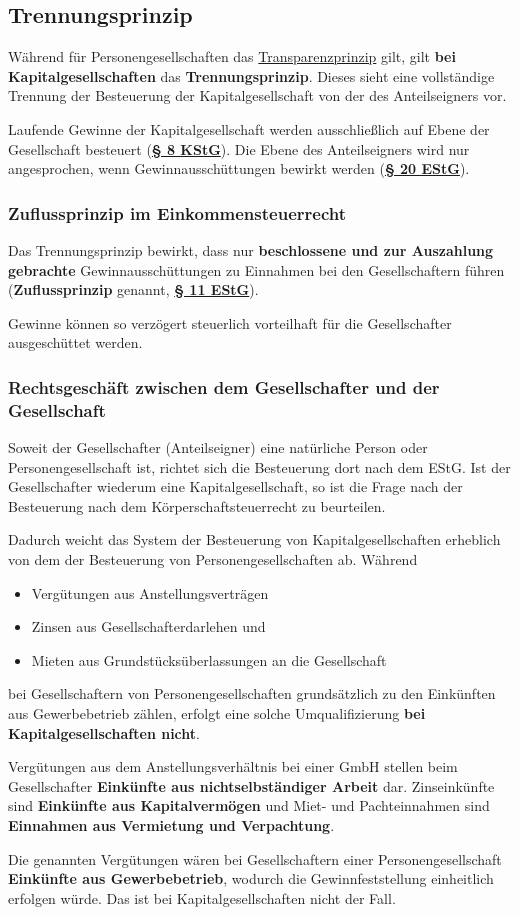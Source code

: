 \documentclass[12pt,A4]{extarticle}
\newcommand{\highlight}[1]{\textcolor{highlightColor}{\textbf{#1}}}
\newcommand{\estG}[2][]{\textbf{\textcolor{gesetzLink}{\href{https://www.gesetze-im-internet.de/estg/__#2.html}{§ #2 \ifthenelse{\equal{#1}{}}{}{#1 }EStG}}}}
\newcommand{\kstG}[2][]{\textbf{\textcolor{gesetzLink}{\href{https://www.gesetze-im-internet.de/kstg_1977/__#2.html}{§ #2 \ifthenelse{\equal{#1}{}}{}{#1 }KStG}}}}
\begin{document}
\subsection{Trennungsprinzip}
Während für Personengesellschaften das \hyperref[sec:transparenzprinzip]{Transparenzprinzip} gilt, gilt \textbf{bei Kapitalgesellschaften} das \highlight{Trennungsprinzip}. Dieses sieht eine vollständige Trennung der Besteuerung der Kapitalgesellschaft von der des Anteilseigners vor.\par
Laufende Gewinne der Kapitalgesellschaft werden ausschließlich auf Ebene der Gesellschaft besteuert (\kstG[Abs. 3 Satz 1]{8}). Die Ebene des Anteilseigners wird nur angesprochen, wenn Gewinnausschüttungen bewirkt werden (\estG[Abs. 1 Nr. 1]{20}).

\subsubsection{Zuflussprinzip im Einkommensteuerrecht}
Das Trennungsprinzip bewirkt, dass nur \textbf{beschlossene und zur Auszahlung gebrachte} Gewinnausschüttungen zu Einnahmen bei den Gesellschaftern führen (\highlight{Zuflussprinzip} genannt, \estG{11}).\par
Gewinne können so verzögert steuerlich vorteilhaft für die Gesellschafter ausgeschüttet werden.

\subsubsection{Rechtsgeschäft zwischen dem Gesellschafter und der Gesellschaft}
Soweit der Gesellschafter (Anteilseigner) eine natürliche Person oder Personengesellschaft ist, richtet sich die Besteuerung dort nach dem EStG. Ist der Gesellschafter wiederum eine Kapitalgesellschaft, so ist die Frage nach der Besteuerung nach dem Körperschaftsteuerrecht zu beurteilen.\par
Dadurch weicht das System der Besteuerung von Kapitalgesellschaften erheblich von dem der Besteuerung von Personengesellschaften ab. Während
\begin{itemize}
  \item{Vergütungen aus Anstellungsverträgen}
  \item{Zinsen aus Gesellschafterdarlehen und}
  \item{Mieten aus Grundstücksüberlassungen an die Gesellschaft}
\end{itemize}
bei Gesellschaftern von Personengesellschaften grundsätzlich zu den Einkünften aus Gewerbebetrieb zählen, erfolgt eine solche Umqualifizierung \textbf{bei Kapitalgesellschaften nicht}.\par
Vergütungen aus dem Anstellungsverhältnis bei einer GmbH stellen beim Gesellschafter \textbf{Einkünfte aus nichtselbständiger Arbeit} dar. Zinseinkünfte sind \textbf{Einkünfte aus Kapitalvermögen} und Miet- und Pachteinnahmen sind \textbf{Einnahmen aus Vermietung und Verpachtung}.\par
Die genannten Vergütungen wären bei Gesellschaftern einer Personengesellschaft \textbf{Einkünfte aus Gewerbebetrieb}, wodurch die Gewinnfeststellung einheitlich erfolgen würde. Das ist bei Kapitalgesellschaften nicht der Fall.\par
\end{document}
